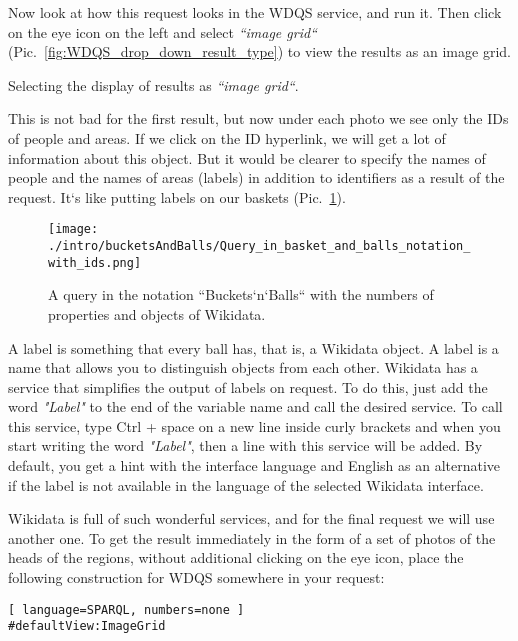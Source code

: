 Now look at how this request looks in the WDQS service, and run it. Then click on the eye icon on the left and select \textit{``image grid``} (Pic.~\ref{fig:WDQS_drop_down_result_type}) to view the results as an image grid.

\begin{marginfigure}[-1cm]
	{
		\setlength{\fboxsep}{0pt}%
		\setlength{\fboxrule}{1pt}%
	}
    \caption{Selecting the display of results as \textit{``image grid``}.}
	\label{fig:WDQS_drop_down_result_type}
\end{marginfigure}

This is not bad for the first result, but now under each photo we see only the IDs of people and areas. If we click on the ID hyperlink, we will get a lot of information about this object. But it would be clearer to specify the names of people and the names of areas (labels) in addition to identifiers as a result of the request. It`s like putting labels on our baskets (Pic.~\ref{fig:Query_in_basket_and_balls_notation_with_ids}).

\begin{figure}[h!]
\texttt{[image: ./intro/bucketsAndBalls/Query\_in\_basket\_and\_balls\_notation\_with\_ids.png]}
\caption{A query in the notation ``Buckets`n`Balls`` with the numbers of properties and objects of Wikidata.}
\label{fig:Query_in_basket_and_balls_notation_with_ids}
\end{figure}

A label is something that every ball has, that is, a Wikidata object. A label is a name that allows you to distinguish objects from each other. Wikidata has a service that simplifies the output of labels on request. To do this, just add the word \textit{"Label"} to the end of the variable name and call the desired service. To call this service, type Ctrl + space on a new line inside curly brackets and when you start writing the word \textit{"Label"}, then a line with this service will be added. By default, you get a hint with the interface language and English as an alternative if the label is not available in the language of the selected Wikidata interface.

Wikidata is full of such wonderful services, and for the final request we will use another one. To get the result immediately in the form of a set of photos of the heads of the regions, without additional clicking on the eye icon, place the following construction for WDQS somewhere in your request:
\begin{lstlisting}[ language=SPARQL, numbers=none ]
#defaultView:ImageGrid
\end{lstlisting}

